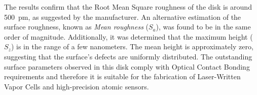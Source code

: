 \begin{table}[htbp]
\centering
{}
\caption{Surface parameters obtained through AFM in three different parts of 
the surface: \textit{Root mean square roughness} ($S_q$), \textit{Mean 
roughness} ($S_a$), \textit{Maximum peak height} ($S_p$), \textit{Minimum 
valley depth} ($S_v$), \textit{Maximum height} ($S_z$) and \textit{Mean 
height}.}
\label{tab:afm}
\end{table}

The results confirm that the Root Mean Square roughness of the disk is 
around \SI{500}{\pico\meter}, as suggested by the manufacturer. An 
alternative estimation of the surface roughness, known as \textit{Mean 
roughness} ($S_a$), was found to be in the same order of magnitude. 
Additionally, it was determined that the maximum height ($S_z$) is in the 
range of a few nanometers. The mean height is approximately zero, suggesting 
that the surface's defects are uniformly distributed. The outstanding surface 
parameters observed in this disk comply with Optical Contact Bonding 
requirements and therefore it is suitable for the fabrication of 
Laser-Written Vapor Cells and high-precision atomic sensors.